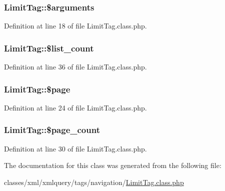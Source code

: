 \subsubsection[{\$arguments}]{\setlength{\rightskip}{0pt plus 5cm}Limit\+Tag\+::\$arguments}\label{classLimitTag_aca5deed1e4200fbc10bf96b3af1bb0aa}


Definition at line 18 of file Limit\+Tag.\+class.\+php.

\hypertarget{classLimitTag_aec51c8433d2e7a1e009b7c331702cef0}{}
\subsubsection[{\$list\+\_\+count}]{\setlength{\rightskip}{0pt plus 5cm}Limit\+Tag\+::\$list\+\_\+count}\label{classLimitTag_aec51c8433d2e7a1e009b7c331702cef0}


Definition at line 36 of file Limit\+Tag.\+class.\+php.

\hypertarget{classLimitTag_aae0faff40b6bcd38d72350bd851ecd4b}{}
\subsubsection[{\$page}]{\setlength{\rightskip}{0pt plus 5cm}Limit\+Tag\+::\$page}\label{classLimitTag_aae0faff40b6bcd38d72350bd851ecd4b}


Definition at line 24 of file Limit\+Tag.\+class.\+php.

\hypertarget{classLimitTag_a3d25270d024a280ac3e1cc7ada2c8fe0}{}
\subsubsection[{\$page\+\_\+count}]{\setlength{\rightskip}{0pt plus 5cm}Limit\+Tag\+::\$page\+\_\+count}\label{classLimitTag_a3d25270d024a280ac3e1cc7ada2c8fe0}


Definition at line 30 of file Limit\+Tag.\+class.\+php.



The documentation for this class was generated from the following file\+:\begin{DoxyCompactItemize}
\item 
classes/xml/xmlquery/tags/navigation/\hyperlink{LimitTag_8class_8php}{Limit\+Tag.\+class.\+php}\end{DoxyCompactItemize}
